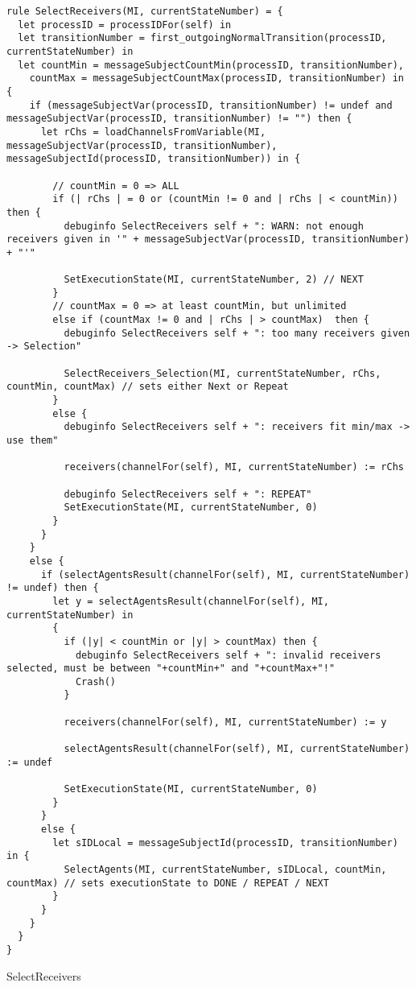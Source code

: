 \begin{listing}[H]
\begin{verbatim}
rule SelectReceivers(MI, currentStateNumber) = {
  let processID = processIDFor(self) in
  let transitionNumber = first_outgoingNormalTransition(processID, currentStateNumber) in
  let countMin = messageSubjectCountMin(processID, transitionNumber),
    countMax = messageSubjectCountMax(processID, transitionNumber) in {
    if (messageSubjectVar(processID, transitionNumber) != undef and messageSubjectVar(processID, transitionNumber) != "") then {
      let rChs = loadChannelsFromVariable(MI, messageSubjectVar(processID, transitionNumber), messageSubjectId(processID, transitionNumber)) in {

        // countMin = 0 => ALL
        if (| rChs | = 0 or (countMin != 0 and | rChs | < countMin)) then {
          debuginfo SelectReceivers self + ": WARN: not enough receivers given in '" + messageSubjectVar(processID, transitionNumber) + "'"

          SetExecutionState(MI, currentStateNumber, 2) // NEXT
        }
        // countMax = 0 => at least countMin, but unlimited
        else if (countMax != 0 and | rChs | > countMax)  then {
          debuginfo SelectReceivers self + ": too many receivers given -> Selection"

          SelectReceivers_Selection(MI, currentStateNumber, rChs, countMin, countMax) // sets either Next or Repeat
        }
        else {
          debuginfo SelectReceivers self + ": receivers fit min/max -> use them"

          receivers(channelFor(self), MI, currentStateNumber) := rChs

          debuginfo SelectReceivers self + ": REPEAT"
          SetExecutionState(MI, currentStateNumber, 0)
        }
      }
    }
    else {
      if (selectAgentsResult(channelFor(self), MI, currentStateNumber) != undef) then {
        let y = selectAgentsResult(channelFor(self), MI, currentStateNumber) in
        {
          if (|y| < countMin or |y| > countMax) then {
            debuginfo SelectReceivers self + ": invalid receivers selected, must be between "+countMin+" and "+countMax+"!"
            Crash()
          }

          receivers(channelFor(self), MI, currentStateNumber) := y

          selectAgentsResult(channelFor(self), MI, currentStateNumber) := undef

          SetExecutionState(MI, currentStateNumber, 0)
        }
      }
      else {
        let sIDLocal = messageSubjectId(processID, transitionNumber) in {
          SelectAgents(MI, currentStateNumber, sIDLocal, countMin, countMax) // sets executionState to DONE / REPEAT / NEXT
        }
      }
    }
  }
}
\end{verbatim}
\caption{SelectReceivers}
\label{lst:asm:SelectReceivers}
\end{listing}





